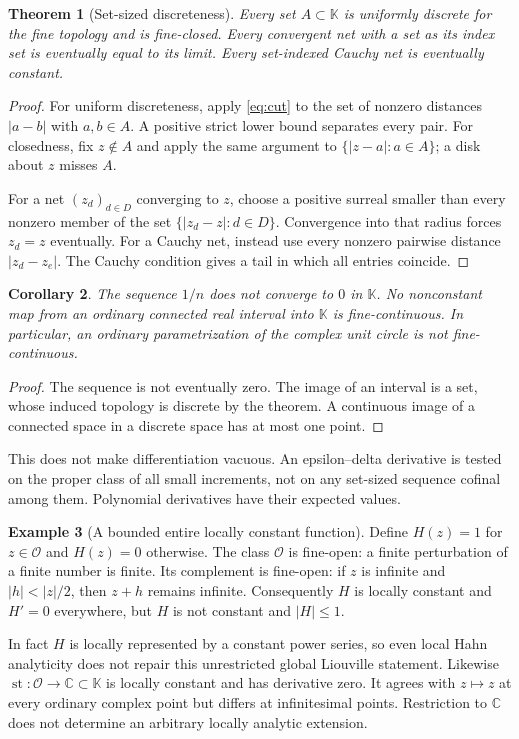 \documentclass[11pt,a4paper]{article}
\numberwithin{equation}{section}
\newtheorem{theorem}{Theorem}[section]
\newtheorem{corollary}[theorem]{Corollary}
\theoremstyle{definition}
\newtheorem{example}[theorem]{Example}
\theoremstyle{remark}
\newcommand{\K}{\mathbb K}
\newcommand{\C}{\mathbb C}
\newcommand{\OO}{\mathcal O}
\newcommand{\st}{\operatorname{st}}
\begin{document}
\begin{theorem}[Set-sized discreteness]
\label{thm:discrete}
Every set $A\subset\K$ is uniformly discrete for the fine topology and is fine-closed. Every convergent net with a set as its index set is eventually equal to its limit. Every set-indexed Cauchy net is eventually constant.
\end{theorem}
\begin{proof}
For uniform discreteness, apply \eqref{eq:cut} to the set of nonzero distances $|a-b|$ with $a,b\in A$. A positive strict lower bound separates every pair. For closedness, fix $z\notin A$ and apply the same argument to $\{|z-a|:a\in A\}$; a disk about $z$ misses $A$.

For a net $(z_d)_{d\in D}$ converging to $z$, choose a positive surreal smaller than every nonzero member of the set $\{|z_d-z|:d\in D\}$. Convergence into that radius forces $z_d=z$ eventually. For a Cauchy net, instead use every nonzero pairwise distance $|z_d-z_e|$. The Cauchy condition gives a tail in which all entries coincide.
\end{proof}

\begin{corollary}
The sequence $1/n$ does not converge to $0$ in $\K$. No nonconstant map from an ordinary connected real interval into $\K$ is fine-continuous. In particular, an ordinary parametrization of the complex unit circle is not fine-continuous.
\end{corollary}
\begin{proof}
The sequence is not eventually zero. The image of an interval is a set, whose induced topology is discrete by the theorem. A continuous image of a connected space in a discrete space has at most one point.
\end{proof}

This does not make differentiation vacuous. An epsilon--delta derivative is tested on the proper class of all small increments, not on any set-sized sequence cofinal among them. Polynomial derivatives have their expected values.

\begin{example}[A bounded entire locally constant function]
\label{ex:locconstant}
Define $H(z)=1$ for $z\in\OO$ and $H(z)=0$ otherwise. The class $\OO$ is fine-open: a finite perturbation of a finite number is finite. Its complement is fine-open: if $z$ is infinite and $|h|<|z|/2$, then $z+h$ remains infinite. Consequently $H$ is locally constant and $H'=0$ everywhere, but $H$ is not constant and $|H|\leq1$.
\end{example}
In fact $H$ is locally represented by a constant power series, so even local Hahn analyticity does not repair this unrestricted global Liouville statement. Likewise $\st:\OO\to\C\subset\K$ is locally constant and has derivative zero. It agrees with $z\mapsto z$ at every ordinary complex point but differs at infinitesimal points. Restriction to $\C$ does not determine an arbitrary locally analytic extension.
\end{document}
